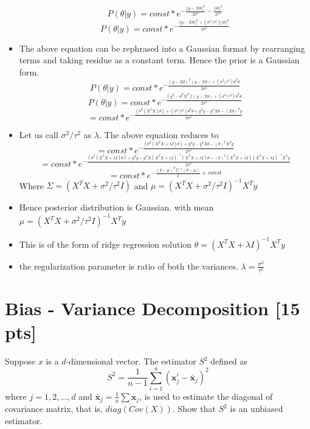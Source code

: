 \documentclass[twoside,10pt]{article}
\begin{document}
\begin{itemize}
$$P(\theta|y)  = const * e^{- \frac{||y-X\theta||^2}{2\sigma^2} - \frac{||\theta||^2}{2\tau^2}}$$
$$P(\theta|y)  = const * e^{- \frac{||y-X\theta||^2 + (\sigma^2/\tau^2)||\theta||^2}{2\sigma^2} }$$
\item The above equation can be rephrased into a Gaussian format by rearranging terms and taking residue as a constant term. Hence the prior is a Gaussian form.
$$P(\theta|y)  = const * e^{- \frac{(y-X\theta)^T (y-X\theta) + (\sigma^2/\tau^2) \theta^T \theta}{2\sigma^2} }$$
$$P(\theta|y)  = const * e^{ -\frac{(y^T-\theta^T X^T) (y-X\theta) + (\sigma^2/\tau^2) \theta^T \theta}{2\sigma^2} } $$ 
$$ = const * e^{- \frac{(\theta^T (X^T X )\theta) + (\sigma^2/\tau^2) \theta^T \theta + y^T y 
- y^T X\theta -(X\theta)^T y}{2\sigma^2} }$$
\item Let us call $\sigma^2/\tau^2$ as $\lambda$. The above equation reduces to
$$ = const * e^{- \frac{(\theta^T (X^T X + \lambda I)\theta) + y^T y 
- y^T X\theta -(\theta)^T X^T y}{2\sigma^2} }$$
$$ = const * e^{- \frac{(\theta^T (X^T X + \lambda I)\theta) + y^T y 
- y^T X (X^T X + \lambda I) ^ {-1} (X^T X + \lambda I)\theta -(\theta)^T (X^T X + \lambda I)  (X^T X + \lambda I)^ {-1} X^T y}{2\sigma^2} }$$
$$ = const * e^{- \frac{(\theta - \mu)^T \Sigma ^ {-1}  (\theta - \mu)}{2} + const}$$
Where 
$ \Sigma =  (X^T X + \sigma^2/\tau^2 I)$ and 
$ \mu =  (X^T X + \sigma^2/\tau^2 I)^{-1} X^T y $
\item Hence posterior distribution is Gaussian. with mean 
$\boxed{\mu = (X^T X + \sigma^2/\tau^2 I)^{-1} X^T y} $
\item This is of the form of ridge regression solution $\theta = (X^T X + \lambda I)^{-1} X^T y$ 
\item the regularization parameter is ratio of both the variances.
$\boxed{\lambda = \frac{\sigma^2}{\tau^2}}$
\end{itemize}



\newpage
\section{Bias - Variance Decomposition [15 pts]}

Suppose $x$ is a $d$-dimensional vector. The estimator $S^2$ defined as
$$ S^2 = \frac{1}{n-1} \sum_{i=1}^{n}(\textbf{x}_j^i - \bar{\textbf{x}}_j)^2 $$
where $j = 1, 2, ..., d$ and $\bar{\textbf{x}}_j = \frac{1}{n} \sum \textbf{x}_j$, is used to estimate the diagonal of covariance matrix, that is, $diag(Cov(X))$. Show that $S^2$ is an unbiased estimator.
\end{document}
